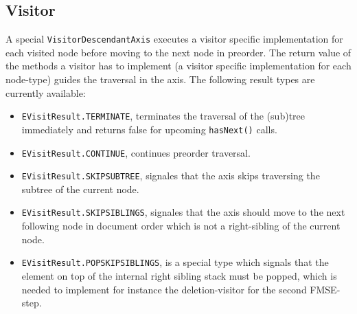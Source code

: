 \subsection{Visitor}\label{subsec::visitor}
A special \texttt{VisitorDescendantAxis} executes a visitor specific implementation for each visited node before moving to the next node in preorder. The return value of the methods a visitor has to implement (a visitor specific implementation for each node-type) guides the traversal in the axis. The following result types are currently available:

\begin{itemize}
\item \texttt{EVisitResult.TERMINATE}, terminates the traversal of the (sub)tree immediately and returns false for upcoming \texttt{hasNext()} calls.
\item \texttt{EVisitResult.CONTINUE}, continues preorder traversal.
\item \texttt{EVisitResult.SKIPSUBTREE}, signales that the axis skips traversing the subtree of the current node.
\item \texttt{EVisitResult.SKIPSIBLINGS}, signales that the axis should move to the next following node in document order which is not a right-sibling of the current node.
\item \texttt{EVisitResult.POPSKIPSIBLINGS}, is a special type which signals that the element on top of the internal right sibling stack must be popped, which is needed to implement for instance the deletion-visitor for the second FMSE-step.
\end{itemize}

